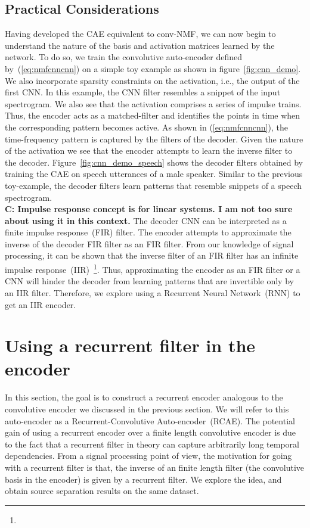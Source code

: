 \documentclass{article}
\begin{document}
\subsection{Practical Considerations}
\label{subsec:practical}
Having developed the CAE equivalent to conv-NMF, we can now begin to understand the nature of the basis and activation matrices learned by the network. To do so, we train the convolutive auto-encoder defined by~(\ref{eq:nmfcnncnn}) on a simple toy example as shown in figure~\ref{fig:cnn_demo}. We also incorporate sparsity constraints on the activation, i.e., the output of the first CNN. In this example, the CNN filter resembles a snippet of the input spectrogram. We also see that the activation comprises a series of impulse trains. Thus, the encoder acts as a matched-filter and identifies the points in time when the corresponding pattern becomes active. As shown in (\ref{eq:nmfcnncnn}), the time-frequency pattern is captured by the filters of the decoder. Given the nature of the activation we see that the encoder attempts to learn the inverse filter to the decoder. Figure~\ref{fig:cnn_demo_speech} shows the decoder filters obtained by training the CAE on speech utterances of a male speaker. Similar to the previous toy-example, the decoder filters learn patterns that resemble snippets of a speech spectrogram. \\

\textbf{C: Impulse response concept is for linear systems. I am not too sure about using it in this context.} The decoder CNN can be interpreted as a finite impulse response~(FIR) filter. The encoder attempts to approximate the inverse of the decoder FIR filter as an FIR filter. From our knowledge of signal processing, it can be shown that the inverse filter of an FIR filter has an infinite impulse response~(IIR)~\cite{smith2011spectral}\footnote{}. Thus, approximating the encoder as an FIR filter or a CNN will hinder the decoder from learning patterns that are invertible only by an IIR filter. Therefore, we explore using a Recurrent Neural Network~(RNN) to get an IIR encoder. \\

\section{Using a recurrent filter in the encoder}
\label{sec:rnncnn}
In this section, the goal is to construct a recurrent encoder analogous to the convolutive encoder we discussed in the previous section. We will refer to this auto-encoder as a Recurrent-Convolutive Auto-encoder~(RCAE). The potential gain of using a recurrent encoder over a finite length convolutive encoder is due to the fact that a recurrent filter in theory can capture arbitrarily long temporal dependencies. From a signal processing point of view, the motivation for going with a recurrent filter is that, the inverse of an finite length filter (the convolutive basis in the encoder) is given by a recurrent filter. We explore the idea, and obtain source separation results on the same dataset. \\
\end{document}
